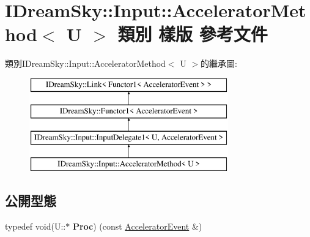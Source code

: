 \hypertarget{class_i_dream_sky_1_1_input_1_1_accelerator_method}{}\section{I\+Dream\+Sky\+:\+:Input\+:\+:Accelerator\+Method$<$ U $>$ 類別 樣版 參考文件}
\label{class_i_dream_sky_1_1_input_1_1_accelerator_method}
類別\+I\+Dream\+Sky\+:\+:Input\+:\+:Accelerator\+Method$<$ U $>$的繼承圖\+:\begin{figure}[H]
\begin{center}
\leavevmode
\includegraphics[height=4.000000cm]{class_i_dream_sky_1_1_input_1_1_accelerator_method}
\end{center}
\end{figure}
\subsection*{公開型態}
\begin{DoxyCompactItemize}
\item 
typedef void(U\+::$\ast$ {\bfseries Proc}) (const \hyperlink{class_i_dream_sky_1_1_input_1_1_accelerator_event}{Accelerator\+Event} \&)\hypertarget{class_i_dream_sky_1_1_input_1_1_accelerator_method_adf927b9050caac655f11b594192103dc}{}\label{class_i_dream_sky_1_1_input_1_1_accelerator_method_adf927b9050caac655f11b594192103dc}

\end{DoxyCompactItemize}
